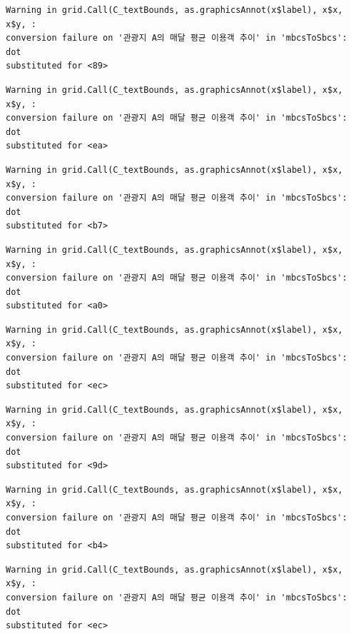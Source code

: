\documentclass[
  letterpaper,
  DIV=11,
  numbers=noendperiod]{scrreprt}
\begin{document}
\begin{verbatim}
Warning in grid.Call(C_textBounds, as.graphicsAnnot(x$label), x$x, x$y, :
conversion failure on '관광지 A의 매달 평균 이용객 추이' in 'mbcsToSbcs': dot
substituted for <89>
\end{verbatim}

\begin{verbatim}
Warning in grid.Call(C_textBounds, as.graphicsAnnot(x$label), x$x, x$y, :
conversion failure on '관광지 A의 매달 평균 이용객 추이' in 'mbcsToSbcs': dot
substituted for <ea>
\end{verbatim}

\begin{verbatim}
Warning in grid.Call(C_textBounds, as.graphicsAnnot(x$label), x$x, x$y, :
conversion failure on '관광지 A의 매달 평균 이용객 추이' in 'mbcsToSbcs': dot
substituted for <b7>
\end{verbatim}

\begin{verbatim}
Warning in grid.Call(C_textBounds, as.graphicsAnnot(x$label), x$x, x$y, :
conversion failure on '관광지 A의 매달 평균 이용객 추이' in 'mbcsToSbcs': dot
substituted for <a0>
\end{verbatim}

\begin{verbatim}
Warning in grid.Call(C_textBounds, as.graphicsAnnot(x$label), x$x, x$y, :
conversion failure on '관광지 A의 매달 평균 이용객 추이' in 'mbcsToSbcs': dot
substituted for <ec>
\end{verbatim}

\begin{verbatim}
Warning in grid.Call(C_textBounds, as.graphicsAnnot(x$label), x$x, x$y, :
conversion failure on '관광지 A의 매달 평균 이용객 추이' in 'mbcsToSbcs': dot
substituted for <9d>
\end{verbatim}

\begin{verbatim}
Warning in grid.Call(C_textBounds, as.graphicsAnnot(x$label), x$x, x$y, :
conversion failure on '관광지 A의 매달 평균 이용객 추이' in 'mbcsToSbcs': dot
substituted for <b4>
\end{verbatim}

\begin{verbatim}
Warning in grid.Call(C_textBounds, as.graphicsAnnot(x$label), x$x, x$y, :
conversion failure on '관광지 A의 매달 평균 이용객 추이' in 'mbcsToSbcs': dot
substituted for <ec>
\end{verbatim}
\end{document}
